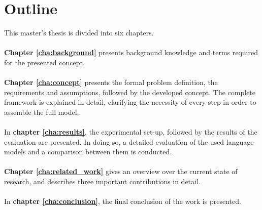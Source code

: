 

\section{Outline\label{sec:outline}}


This master's thesis is divided into six chapters.
\\
\\
\textbf{Chapter \ref{cha:background}} presents background knowledge and terms required for the presented concept.
\\
\\
\textbf{Chapter \ref{cha:concept}} presents the formal problem definition, the requirements and assumptions, followed by the developed concept. The complete framework is explained in detail, clarifying the necessity of every step in order to assemble the full model.
\\
\\
In \textbf{chapter \ref{cha:results}}, the experimental set-up, followed by the results of the evaluation are presented. In doing so, a detailed evaluation of the used language models and a comparison between them is conducted.
\\
\\
\textbf{Chapter \ref{cha:related_work}} gives an overview over the current state of research, and describes three important contributions in detail.
\\
\\
In \textbf{chapter \ref{cha:conclusion}}, the final conclusion of the work is presented.




